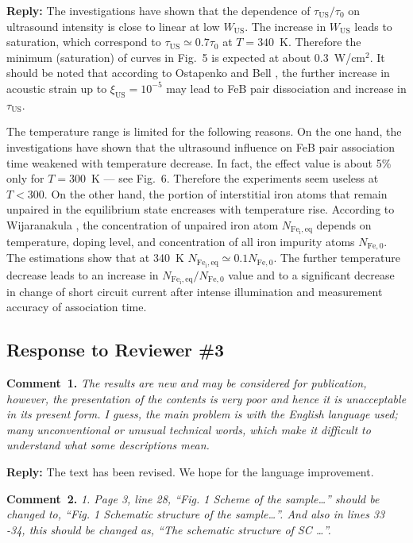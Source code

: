 \documentclass[sn-mathphys]{sn-jnl}
\begin{document}
\noindent
\textcolor[rgb]{0.51,0.00,0.00}{\textbf{Reply:}}
The investigations have shown that the dependence of $\tau_\mathrm{US}/\tau_{0}$
on ultrasound intensity is close to linear at low $W_\mathrm{US}$.
The increase in $W_\mathrm{US}$ leads to saturation, which correspond to
$\tau_\mathrm{US}\simeq0.7\tau_{0}$ at $T=340$~K.
Therefore the minimum (saturation) of curves in Fig.~5 is expected at about $0.3$~W/cm$^2$.
It should be noted that according to Ostapenko and Bell \cite{Ostapenko1995},
the further increase in acoustic strain up to $\xi_\mathrm{US}=10^{-5}$ may lead to
FeB pair dissociation and increase in $\tau_\mathrm{US}$.

The temperature range is limited for the following reasons.
On the one hand, the investigations have shown that the ultrasound influence
on FeB pair association time weakened with temperature decrease.
 In fact, the effect value is about 5\% only for $T=300$~K --- see Fig.~6.
Therefore the experiments seem useless at $T<300$.
On the other hand, the portion of interstitial iron atoms that
remain unpaired in the equilibrium state encreases with temperature rise.
According to Wijaranakula \cite{FeB:kinetic}, the concentration of
unpaired iron atom $N_\mathrm{Fe_i,eq}$
depends on temperature, doping level, and concentration of
all iron impurity atoms $N_\mathrm{Fe,0}$.
The estimations show that at 340~K $N_\mathrm{Fe_i,eq}\simeq0.1N_\mathrm{Fe,0}$.
The further temperature decrease leads to an increase in
$N_\mathrm{Fe_i,eq}/N_\mathrm{Fe,0}$ value and
to a significant decrease in change of short circuit current after intense illumination
and measurement accuracy of association time.



\subsection*{Response to Reviewer \#3 }
\noindent
\textcolor[rgb]{0.00,0.50,1.00}{\textbf{Comment~1.}}
\emph{The results are new and may be considered for publication, however, the presentation of the contents is very poor and hence it is unacceptable in its present form.
I guess, the main problem is with the English language used;  many unconventional or unusual technical words, which make it difficult to understand what some descriptions mean. }

\noindent
\textcolor[rgb]{0.51,0.00,0.00}{\textbf{Reply:}}
The text has been revised. We hope for the language improvement.


\vspace{1cm}
\noindent
\textcolor[rgb]{0.00,0.50,1.00}{\textbf{Comment~2.}}
\emph{1.	Page 3, line 28, “Fig. 1 Scheme of the sample…” should be changed to, “Fig. 1 Schematic structure of the sample…”. And also in lines 33 -34, this should be changed as, “The schematic structure of SC …”.}
\end{document}
